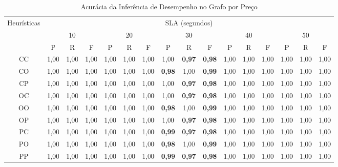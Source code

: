 \begin{table}[htbp]
  \centering
  {\fontsize{2.4mm}{1em}\selectfont
    \begin{tabular}{|c|c|c|c|c|c|c|c|c|c|c|c|c|c|c|c|}
    \hline          
    \multirow{3}{*}{Heurísticas} & \multicolumn{15}{c|}{SLA (segundos)} \\
    \cline{2-16}
          & \multicolumn{3}{c|}{10} & \multicolumn{3}{c|}{20} & \multicolumn{3}{c|}{30} & \multicolumn{3}{c|}{40} & \multicolumn{3}{c|}{50} \\
          \cline{2-16}
          & P     & R     & F     & P     & R     & F     & P     & R     & F     & P     & R     & F     & P     & R     & F \\
          \hline
    CC    & 1,00  & 1,00  & 1,00  & 1,00  & 1,00  & 1,00  & 1,00  & \textbf{\color{red}0,97}  & \textbf{\color{red}0,98}  & 1,00  & 1,00  & 1,00  & 1,00  & 1,00  & 1,00 \\
    CO    & 1,00  & 1,00  & 1,00  & 1,00  & 1,00  & 1,00  & \textbf{\color{red}0,98}  & 1,00  & \textbf{\color{red}0,99}  & 1,00  & 1,00  & 1,00  & 1,00  & 1,00  & 1,00 \\
    CP    & 1,00  & 1,00  & 1,00  & 1,00  & 1,00  & 1,00  & 1,00  & \textbf{\color{red}0,97}  & \textbf{\color{red}0,98}  & 1,00  & 1,00  & 1,00  & 1,00  & 1,00  & 1,00 \\
    OC    & 1,00  & 1,00  & 1,00  & 1,00  & 1,00  & 1,00  & 1,00  & \textbf{\color{red}0,97}  & \textbf{\color{red}0,98}  & 1,00  & 1,00  & 1,00  & 1,00  & 1,00  & 1,00 \\
    OO    & 1,00  & 1,00  & 1,00  & 1,00  & 1,00  & 1,00  & \textbf{\color{red}0,98}  & 1,00  & \textbf{\color{red}0,99}  & 1,00  & 1,00  & 1,00  & 1,00  & 1,00  & 1,00 \\
    OP    & 1,00  & 1,00  & 1,00  & 1,00  & 1,00  & 1,00  & 1,00  & \textbf{\color{red}0,97}  & \textbf{\color{red}0,98}  & 1,00  & 1,00  & 1,00  & 1,00  & 1,00  & 1,00 \\
    PC    & 1,00  & 1,00  & 1,00  & 1,00  & 1,00  & 1,00  & \textbf{\color{red}0,99}  & \textbf{\color{red}0,97}  & \textbf{\color{red}0,98}  & 1,00  & 1,00  & 1,00  & 1,00  & 1,00  & 1,00 \\
    PO    & 1,00  & 1,00  & 1,00  & 1,00  & 1,00  & 1,00  & \textbf{\color{red}0,98}  & 1,00  & \textbf{\color{red}0,99}  & 1,00  & 1,00  & 1,00  & 1,00  & 1,00  & 1,00 \\
    PP    & 1,00  & 1,00  & 1,00  & 1,00  & 1,00  & 1,00  & \textbf{\color{red}0,99}  & \textbf{\color{red}0,97}  & \textbf{\color{red}0,98}  & 1,00  & 1,00  & 1,00  & 1,00  & 1,00  & 1,00 \\
    \hline
    \end{tabular}%
    }%
  \caption{\label{table:acuracia_preco}Acurácia da Inferência de Desempenho no Grafo por Preço}
\end{table}%

